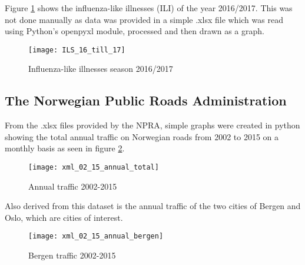 Figure \ref{fig:ilsstat} shows the influenza-like illnesses (ILI) of the year 2016/2017. This was not done manually as data was provided in a simple .xlsx file which was read using Python's openpyxl module, processed and then drawn as a graph.

\begin{figure}[ht]
\texttt{[image: ILS\_16\_till\_17]}
\centering
\caption{Influenza-like illnesses season 2016/2017}
\label{fig:ilsstat}
\end{figure}

\newpage









\subsection{The Norwegian Public Roads Administration}
From the .xlsx files provided by the NPRA, simple graphs were created in python showing the total annual traffic on Norwegian roads from 2002 to 2015 on a monthly basis as seen in figure \ref{fig:anualtotal}.

\begin{figure}[ht]
\texttt{[image: xml\_02\_15\_annual\_total]}
\centering
\caption{Annual traffic 2002-2015}
\label{fig:anualtotal}
\end{figure}

Also derived from this dataset is the annual traffic of the two cities of Bergen and Oslo, which are cities of interest.

\begin{figure}[ht]
\texttt{[image: xml\_02\_15\_annual\_bergen]}
\centering
\caption{Bergen traffic 2002-2015}
\label{fig:anualbergen}
\end{figure}

